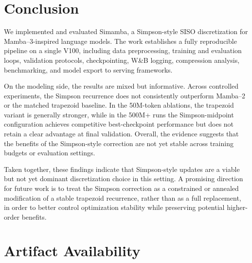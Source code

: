 \documentclass[conference]{IEEEtran}
\newcommand{\modelname}{Simamba\xspace}
\newcommand{\mambatwo}{Mamba--2\xspace}
\newcommand{\mambathree}{Mamba--3\xspace}
\begin{document}
\section{Conclusion}

We implemented and evaluated \modelname, a Simpson-style SISO discretization for \mambathree-inspired language models. The work establishes a fully reproducible pipeline on a single V100, including data preprocessing, training and evaluation loops, validation protocols, checkpointing, W\&B logging, compression analysis, benchmarking, and model export to serving frameworks. 

On the modeling side, the results are mixed but informative. Across controlled experiments, the Simpson recurrence does not consistently outperform \mambatwo or the matched trapezoid baseline. In the 50M-token ablations, the trapezoid variant is generally stronger, while in the 500M+ runs the Simpson-midpoint configuration achieves competitive best-checkpoint performance but does not retain a clear advantage at final validation. Overall, the evidence suggests that the benefits of the Simpson-style correction are not yet stable across training budgets or evaluation settings. 

Taken together, these findings indicate that Simpson-style updates are a viable but not yet dominant discretization choice in this setting. A promising direction for future work is to treat the Simpson correction as a constrained or annealed modification of a stable trapezoid recurrence, rather than as a full replacement, in order to better control optimization stability while preserving potential higher-order benefits.

\section*{Artifact Availability}
\end{document}
